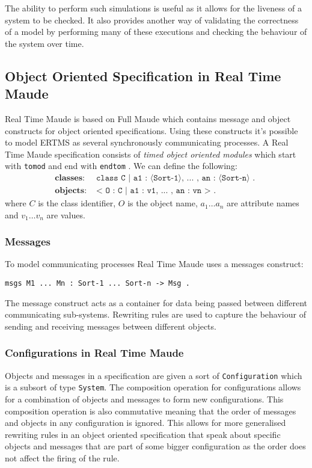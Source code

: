 The ability to perform such simulations is useful as it allows for the liveness of a system to be checked. It also provides another way of validating the correctness of a model by performing many of these executions and checking the behaviour of the system over time.

\subsection{Object Oriented Specification in Real Time Maude}
Real Time Maude is based on Full Maude \cite{MaudeBook} which contains message and object constructs for object oriented specifications. Using these constructs it's possible to model ERTMS as several synchronously communicating processes. A Real Time Maude specification consists of  \emph{timed object oriented modules} which start with \texttt{tomod} and end with \texttt{endtom} \cite{PO07b} .
\medskip
We can define the following:
\begin{align*}
\textbf{classes}: & \texttt{ class C | a1 : ⟨Sort-1⟩, ... , an : ⟨Sort-n⟩ . } \\
\textbf{objects}: & \texttt{ < O : C | a1 : v1, ... , an : vn >  . } 
\end{align*}
where $C$ is the class identifier, $O$ is the object name, $a_1 \ldots a_n$ are attribute names and $v_1 \ldots v_n$ are values. \\
\medskip
\subsubsection*{Messages}
To model communicating processes Real Time Maude uses a messages construct:
\begin{center}
\verb|msgs M1 ... Mn : Sort-1 ... Sort-n -> Msg . | 
\end{center}

The message construct acts as a container for data being passed between different communicating sub-systems. Rewriting rules are used to capture the behaviour of sending and receiving messages between different objects.

\subsubsection*{Configurations in Real Time Maude}
Objects and messages in a specification are given a sort of \texttt{Configuration} which is a subsort of type \texttt{System}. The composition operation for configurations allows for a combination of objects and messages to form new configurations. This composition operation is also commutative meaning that the order of messages and objects in any configuration is ignored. This allows for more generalised rewriting rules in an object oriented specification that speak about specific objects and messages that are part of some bigger configuration as the order does not affect the firing of the rule.

